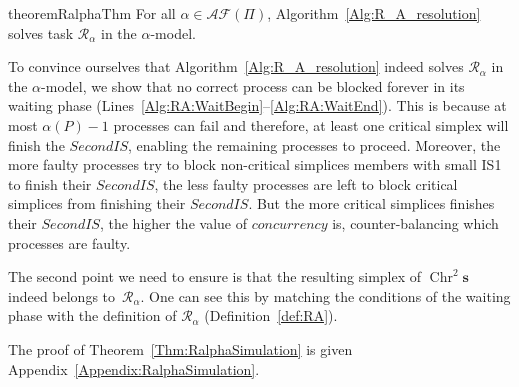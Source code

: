 \documentclass[a4paper]{article}
\newcommand{\remove}[1]{}
\def\R{\ensuremath{\mathcal{R}}}
\def\s {\mathbf{s}}
\def\Chr{\operatorname{Chr}}
\begin{document}
\begin{restatable}{theorem}{RalphaThm}
For all $\alpha\in\mathcal{AF}(\Pi)$, Algorithm~\ref{Alg:R_A_resolution} solves task $\R_\alpha$ in the $\alpha$-model.\label{Thm:RalphaSimulation}
\end{restatable}

To convince ourselves that Algorithm~\ref{Alg:R_A_resolution} indeed solves
$\R_\alpha$ in the $\alpha$-model, we show that no correct
process can be blocked forever in its waiting phase (Lines~\ref{Alg:RA:WaitBegin}--\ref{Alg:RA:WaitEnd}).
This is because at most $\alpha(P)-1$ processes
can fail and therefore, at least one critical simplex will finish the $\mathit{SecondIS}$,
enabling the remaining processes to proceed. 
%
Moreover, the more faulty processes try to block non-critical 
simplices members with small IS1 to finish their $\mathit{SecondIS}$, the 
less faulty processes are left to block critical simplices 
from finishing their $\mathit{SecondIS}$. But the more critical simplices 
finishes their $\mathit{SecondIS}$, the higher the value of $\mathit{concurrency}$ is,
counter-balancing which processes are faulty.

\remove{
we first observe that eventually every correct process
either    
of critical simplices, its members being allowed to continued first before the rest can
follow as most as possible in the same order than in the first immediate snapshot, 
just ensuring that at least one process allowed to continue must be correct (if they
are correct processes left).
}

The second point we need to ensure is that the resulting simplex of
$\Chr^2\s$ indeed belongs to~$\R_{\alpha}$.
%
One can see this by matching the conditions of the waiting phase with the
definition of $\R_{\alpha}$ (Definition~\ref{def:RA}).  
%
\remove{
consists in showing that the second immediate snapshot outputs 
provided to the processes forms in $\Chr^2 \s$ a simplex belonging to $\R_\alpha$.
The fact that it is indeed the case follows mostly from the conditions 
which must be satisfied in order to exit the wait-phase. 
Theses conditions are quite close the restrictions required to form a 
valid $\R_\alpha$ simplex.
}
The proof of Theorem~\ref{Thm:RalphaSimulation} is given Appendix~\ref{Appendix:RalphaSimulation}.

\end{document}

